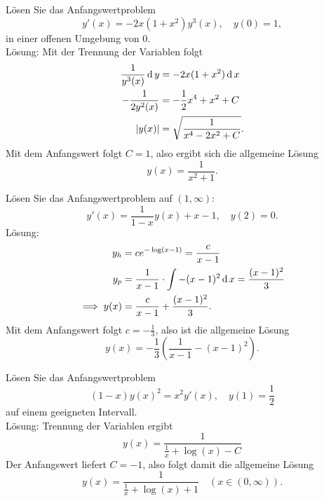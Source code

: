 Lösen Sie das Anfangswertproblem
\begin{displaymath}
  y'(x) = -2x(1 + x^2)y^3(x), \quad y(0) = 1,
\end{displaymath}
in einer offenen Umgebung von $0$.\\
Lösung:
Mit der Trennung der Variablen folgt
\begin{align*}
  \frac{1}{y^3(x)} \operatorname{\mathop{}\!\mathrm{d}} y &= -2x(1 + x^2) \operatorname{\mathop{}\!\mathrm{d}} x\\
  -\frac{1}{2y^2(x)} &= -\frac{1}{2} x^4 + x^2 + C\\
  |y(x)| &= \sqrt{\frac{1}{x^4 - 2x^2 + C}}.
\end{align*}
Mit dem Anfangswert folgt $C = 1$, also ergibt sich die allgemeine Lösung
\begin{displaymath}
  y(x) = \frac{1}{x^2 + 1}.
\end{displaymath}

Lösen Sie das Anfangswertproblem auf $(1, \infty)$:
\begin{displaymath}
  y'(x) = \frac{1}{1 - x} y(x) + x - 1, \quad y(2) = 0.
\end{displaymath}
Lösung:
\begin{align*}
  y_h &= ce^{- \log(x - 1)} = \frac{c}{x - 1}\\
  y_p &= \frac{1}{x - 1} \cdot \int -(x - 1)^2 \operatorname{\mathop{}\!\mathrm{d}} x = \frac{(x - 1)^2}{3}\\
  \implies y(x) &= \frac{c}{x - 1} + \frac{(x-1)^2}{3}.
\end{align*}
Mit dem Anfangswert folgt $c = -\frac{1}{3}$, also ist die allgemeine Lösung
\begin{displaymath}
  y(x) = -\frac{1}{3}\left(\frac{1}{x - 1} - (x - 1)^2\right).
\end{displaymath}

Lösen Sie das Anfangswertproblem
\begin{displaymath}
  (1 - x)y(x)^2 = x^2 y'(x), \quad y(1) = \frac{1}{2}
\end{displaymath}
auf einem geeigneten Intervall.\\
Lösung: Trennung der Variablen ergibt
\begin{displaymath}
  y(x) = \frac{1}{\frac{1}{x} + \log(x) - C}
\end{displaymath}
Der Anfangswert liefert $C = -1$, also folgt damit die allgemeine Lösung
\begin{displaymath}
  y(x) = \frac{1}{\frac{1}{x} + \log(x) + 1} \quad (x \in (0, \infty)).
\end{displaymath}

